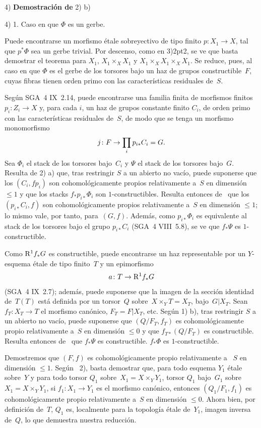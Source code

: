 
{4) \textbf{Demostración de } 2)\kern2pt b)}
{}

4) 1. Caso en que $\Phi$ es un gerbe.

Puede encontrarse un morfismo étale sobreyectivo de tipo finito $p
\colon X_1 \to X$, tal que $p^*\Phi$ sea un gerbe trivial. Por
descenso, como en 3)\kern2pt2, se ve que basta demostrar el teorema
para $X_1$, $X_1\times_X X_1$ y
$X_1\times_X X_1\times_X X_1$. Se reduce, pues, al caso en que
$\Phi$ es el gerbe de los torsores bajo un haz de grupos
constructible~$F$, cuyas fibras tienen orden primo con las
características residuales de~$S$.

Según SGA~4 IX~2.14, puede encontrarse una familia finita de
morfismos finitos $p_i \colon Z_i \to X$ y, para cada $i$, un
haz de grupos constante finito $C_i$, de orden primo con las
características residuales de~$S$, de modo que se tenga un
{morfismo}
{monomorfismo}
$$
j\colon F \to \prod_{i} p_{i*}C_i=G .
$$
Sea $\Phi_i$ el stack de los torsores bajo~$C_i$ y $\Psi$ el stack de
los torsores bajo~$G$. Resulta de 2)\kern2pt a) que, tras restringir
$S$ a un abierto no vacío, puede suponerse que los $(C_i,fp_i)$ son
cohomológicamente propios relativamente a~$S$ en dimensión
$\leqslant 1$ y que los stacks $f_*p_{i*}\Phi_i$ son
$1$-constructibles. Resulta entonces de~ que los
$(p_{i*}C_i,f)$ son cohomológicamente propios relativamente a~$S$
en dimensión $\leqslant 1$; lo mismo vale, por tanto, para~$(G,f)$.
Además, como $p_{i*}\Phi_i$ es equivalente al stack de los torsores
bajo el grupo $p_{i*}C_i$ (SGA~4 VIII~5.8), se ve que $f_*\Psi$ es
$1$-constructible.

Como $\mathrm{R}^1f_*G$ es constructible, puede encontrarse un haz
representable por un $Y$-esquema étale de tipo finito~$T$ y un
epimorfismo
$$
a \colon T \to \mathrm{R}^1f_*G
$$
(SGA~4 IX~2.7); además, puede suponerse que la imagen de la sección
identidad de~$T(T)$ está definida por un torsor~$Q$ sobre~$X\times_Y
T=X_T$, bajo~$G|X_T$. Sean $f_T \colon X_T \to T$ el morfismo
canónico, $F_T=F|X_T$, etc. Según 1)\kern2pt b), tras restringir
$S$ a un abierto no vacío, puede suponerse que $(Q/F_T,f_T)$ es
cohomológicamente propio relativamente a~$S$ en dimensión
$\leqslant 0$ y que $f_{T*}(Q/F_T)$ es constructible. Resulta entonces
de~ que
{$f_*\Psi$ es constructible.}
{$f_*\Phi$ es $1$-constructible.}

Demostremos que $(F,f)$ es cohomológicamente propio relativamente a
~$S$ en dimensión $\leqslant 1$. Según ~2), basta
demostrar que, para todo esquema $Y_1$ étale sobre~$Y$ y para todo
{torsor $Q_1$ sobre~$X_1=X\times_Y Y_1$,}
{torsor $Q_1$ bajo~$G_1$ sobre~$X_1=X\times_Y Y_1$,}
si
$f_1 \colon X_1 \to Y_1$ es el morfismo canónico, entonces
$(Q_1/F_1,f_1)$ es cohomológicamente propio relativamente a~$S$ en
dimensión $\leqslant 0$. Ahora bien, por definición de~$T$, $Q_1$ es,
localmente para la topología étale de~$Y_1$, imagen inversa de~$Q$,
lo que demuestra nuestra reducción.
